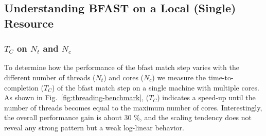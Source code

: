 \documentclass{cpeauth}
\begin{document}
\subsection{Understanding BFAST on a Local (Single) Resource}
\subsubsection{$T_{C}$ on $N_t$ and $N_c$}

To determine how the performance of the bfast match step varies with
the different number of threads ($N_t$) and cores ($N_c$) we measure
the time-to-completion ($T_C$) of the bfast match step on a
single machine with multiple cores.  As shown in
Fig.~\ref{fig:threading-benchmark}, ($T_{C}$) indicates a speed-up
until the number of threads becomes equal to the maximum number of
cores.  Interestingly, the overall performance gain is about 30 \%,
and the scaling tendency does not reveal any strong pattern but a weak
log-linear behavior.


%
%
\end{document}

